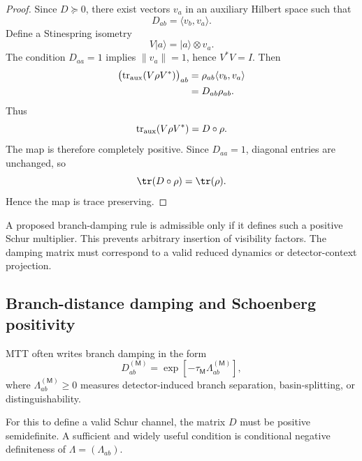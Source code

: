 \documentclass[11pt]{article}
\newcommand{\Meas}{\mathsf M}
\begin{document}
\begin{proof}
Since \(D\succeq0\), there exist vectors \(v_a\) in an auxiliary Hilbert space such that
\begin{equation}
  D_{ab}=\langle v_b,v_a\rangle.
\end{equation}
Define a Stinespring isometry
\begin{equation}
  V|a\rangle=|a\rangle\otimes v_a.
\end{equation}
The condition \(D_{aa}=1\) implies \(\|v_a\|=1\), hence \(V^\ast V=I\). Then
\begin{align}
  \bigl(\operatorname{tr}_{\rm aux}(V\rho V^\ast)\bigr)_{ab}
  &=
  \rho_{ab}\langle v_b,v_a\rangle
  \\
  &=
  D_{ab}\rho_{ab}.
\end{align}
Thus
\begin{equation}
  \operatorname{tr}_{\rm aux}(V\rho V^\ast)=D\circ\rho.
\end{equation}
The map is therefore completely positive. Since \(D_{aa}=1\), diagonal entries are unchanged,
so
\begin{equation}
  \tr(D\circ\rho)=\tr(\rho).
\end{equation}
Hence the map is trace preserving.
\end{proof}

\begin{remark}
\label{rem:admissible-damping-rules}
A proposed branch-damping rule is admissible only if it defines such a positive Schur
multiplier. This prevents arbitrary insertion of visibility factors. The damping matrix must
correspond to a valid reduced dynamics or detector-context projection.
\end{remark}

\subsection{Branch-distance damping and Schoenberg positivity}
\label{subsec:schoenberg-damping}

MTT often writes branch damping in the form
\begin{equation}
  D_{ab}^{(\Meas)}
  =
  \exp[-\tau_{\Meas}\Lambda_{ab}^{(\Meas)}],
  \label{eq:branch-distance-damping}
\end{equation}
where \(\Lambda_{ab}^{(\Meas)}\ge0\) measures detector-induced branch separation,
basin-splitting, or distinguishability.

For this to define a valid Schur channel, the matrix \(D\) must be positive semidefinite.
A sufficient and widely useful condition is conditional negative definiteness of
\(\Lambda=(\Lambda_{ab})\).
\end{document}
